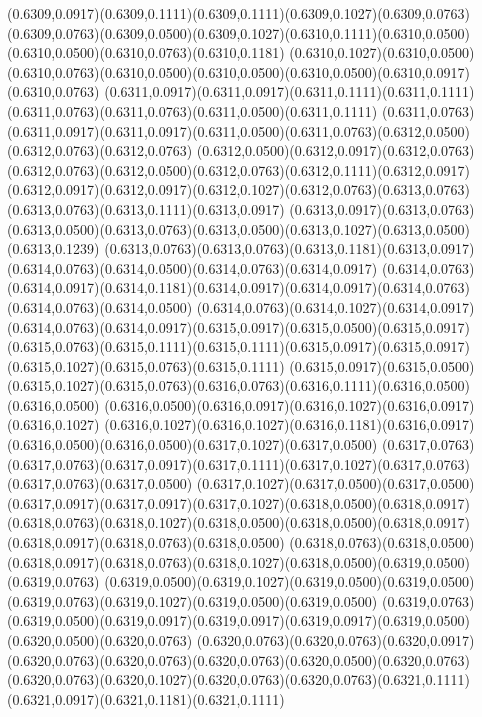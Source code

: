 (0.6309,0.0917)(0.6309,0.1111)(0.6309,0.1111)(0.6309,0.1027)(0.6309,0.0763)
\PST@Solid(0.6309,0.0763)(0.6309,0.0500)(0.6309,0.1027)(0.6310,0.1111)(0.6310,0.0500)(0.6310,0.0500)(0.6310,0.0763)(0.6310,0.1181)
(0.6310,0.1027)(0.6310,0.0500)(0.6310,0.0763)(0.6310,0.0500)(0.6310,0.0500)(0.6310,0.0500)(0.6310,0.0917)(0.6310,0.0763)
(0.6311,0.0917)(0.6311,0.0917)(0.6311,0.1111)(0.6311,0.1111)(0.6311,0.0763)(0.6311,0.0763)(0.6311,0.0500)(0.6311,0.1111)
(0.6311,0.0763)(0.6311,0.0917)(0.6311,0.0917)(0.6311,0.0500)(0.6311,0.0763)(0.6312,0.0500)(0.6312,0.0763)(0.6312,0.0763)
(0.6312,0.0500)(0.6312,0.0917)(0.6312,0.0763)(0.6312,0.0763)(0.6312,0.0500)(0.6312,0.0763)(0.6312,0.1111)(0.6312,0.0917)
(0.6312,0.0917)(0.6312,0.0917)(0.6312,0.1027)(0.6312,0.0763)(0.6313,0.0763)(0.6313,0.0763)(0.6313,0.1111)(0.6313,0.0917)
(0.6313,0.0917)(0.6313,0.0763)(0.6313,0.0500)(0.6313,0.0763)(0.6313,0.0500)(0.6313,0.1027)(0.6313,0.0500)(0.6313,0.1239)
(0.6313,0.0763)(0.6313,0.0763)(0.6313,0.1181)(0.6313,0.0917)(0.6314,0.0763)(0.6314,0.0500)(0.6314,0.0763)(0.6314,0.0917)
(0.6314,0.0763)(0.6314,0.0917)(0.6314,0.1181)(0.6314,0.0917)(0.6314,0.0917)(0.6314,0.0763)(0.6314,0.0763)(0.6314,0.0500)
(0.6314,0.0763)(0.6314,0.1027)(0.6314,0.0917)(0.6314,0.0763)(0.6314,0.0917)(0.6315,0.0917)(0.6315,0.0500)(0.6315,0.0917)
(0.6315,0.0763)(0.6315,0.1111)(0.6315,0.1111)(0.6315,0.0917)(0.6315,0.0917)(0.6315,0.1027)(0.6315,0.0763)(0.6315,0.1111)
(0.6315,0.0917)(0.6315,0.0500)(0.6315,0.1027)(0.6315,0.0763)(0.6316,0.0763)(0.6316,0.1111)(0.6316,0.0500)(0.6316,0.0500)
(0.6316,0.0500)(0.6316,0.0917)(0.6316,0.1027)(0.6316,0.0917)(0.6316,0.1027)
\PST@Solid(0.6316,0.1027)(0.6316,0.1027)(0.6316,0.1181)(0.6316,0.0917)(0.6316,0.0500)(0.6316,0.0500)(0.6317,0.1027)(0.6317,0.0500)
(0.6317,0.0763)(0.6317,0.0763)(0.6317,0.0917)(0.6317,0.1111)(0.6317,0.1027)(0.6317,0.0763)(0.6317,0.0763)(0.6317,0.0500)
(0.6317,0.1027)(0.6317,0.0500)(0.6317,0.0500)(0.6317,0.0917)(0.6317,0.0917)(0.6317,0.1027)(0.6318,0.0500)(0.6318,0.0917)
(0.6318,0.0763)(0.6318,0.1027)(0.6318,0.0500)(0.6318,0.0500)(0.6318,0.0917)(0.6318,0.0917)(0.6318,0.0763)(0.6318,0.0500)
(0.6318,0.0763)(0.6318,0.0500)(0.6318,0.0917)(0.6318,0.0763)(0.6318,0.1027)(0.6318,0.0500)(0.6319,0.0500)(0.6319,0.0763)
(0.6319,0.0500)(0.6319,0.1027)(0.6319,0.0500)(0.6319,0.0500)(0.6319,0.0763)(0.6319,0.1027)(0.6319,0.0500)(0.6319,0.0500)
(0.6319,0.0763)(0.6319,0.0500)(0.6319,0.0917)(0.6319,0.0917)(0.6319,0.0917)(0.6319,0.0500)(0.6320,0.0500)(0.6320,0.0763)
(0.6320,0.0763)(0.6320,0.0763)(0.6320,0.0917)(0.6320,0.0763)(0.6320,0.0763)(0.6320,0.0763)(0.6320,0.0500)(0.6320,0.0763)
(0.6320,0.0763)(0.6320,0.1027)(0.6320,0.0763)(0.6320,0.0763)(0.6321,0.1111)(0.6321,0.0917)(0.6321,0.1181)(0.6321,0.1111)
